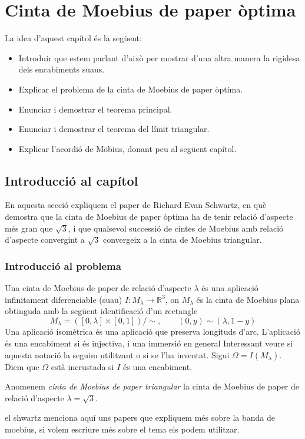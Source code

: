 \chapter{Cinta de Moebius de paper òptima}
{\color{blue}La idea d'aquest capítol és la següent:
\begin{itemize}
    \item Introduir que estem parlant d'això per mostrar d'una altra manera la rigidesa dels encabiments suaus.
    \item Explicar el problema de la cinta de Moebius de paper òptima.
    \item Enunciar i demostrar el teorema principal.
    \item Enunciar i demostrar el teorema del límit triangular.
    \item Explicar l'acordió de Möbius, donant peu al següent capítol.
\end{itemize}
}
\section{Introducció al capítol}
{\color{blue}En aquesta secció expliquem el paper de Richard Evan Schwartz, en què demostra que la cinta de Moebius de paper òptima ha de tenir relació d'aspecte més gran que $\sqrt{3}$, i que qualsevol successió de cintes de Moebius amb relació d'aspecte convergint a $\sqrt{3}$ convergeix a la cinta de Moebius triangular.}
\subsection{Introducció al problema}
\begin{defi}
    Una {\normalfont cinta de Moebius de paper de relació d'aspecte $\lambda$} és una aplicació infinitament diferenciable (suau) $I:M_{\lambda}\to\mathbb R^3$, on $M_\lambda$ és la cinta de Moebius plana obtinguda amb la següent identificació d'un rectangle
    $$M_\lambda = ([0,\lambda] \times [0,1])/\sim, \quad\quad (0,y)\sim(\lambda,1-y)$$
Una {\normalfont aplicació isomètrica} és una aplicació que preserva longituds d'arc. L'aplicació és una {\normalfont encabiment} si és injectiva, i una {\normalfont immersió} en general {\color{blue} Interessant veure si aquesta notació la seguim utilitzant o si se l'ha inventat}. Sigui $\Omega=I(M_\lambda)$. Diem que $\Omega$ està {\normalfont incrustada} si $I$ és una encabiment. 
\end{defi}
\begin{ex}
    Anomenem \textit{cinta de Moebius de paper triangular} la cinta de Moebius de paper de relació d'aspecte $\lambda = \sqrt{3}$.
\end{ex}
{\color{blue} el shwartz menciona aquí uns papers que expliquem més sobre la banda de moebius, si volem escriure més sobre el tema els podem utilitzar.}


